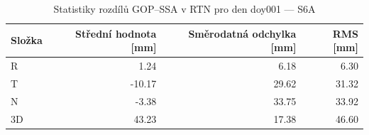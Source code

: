 \begin{table}[H]
\centering
\caption{Statistiky rozdílů GOP–SSA v RTN pro den doy001 — S6A}
\label{tab:gop_vs_ssa_s6a_doy001_day_stats}
\begin{tabular}{lrrr}
\toprule
Složka & Střední hodnota [mm] & Směrodatná odchylka [mm] & RMS [mm] \\
\midrule
R & 1.24 & 6.18 & 6.30 \\
T & -10.17 & 29.62 & 31.32 \\
N & -3.38 & 33.75 & 33.92 \\
3D & 43.23 & 17.38 & 46.60 \\
\bottomrule
\end{tabular}
\end{table}
